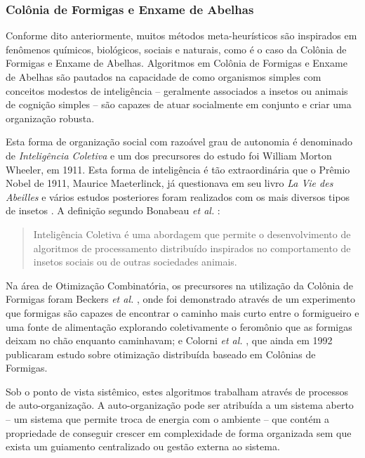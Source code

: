 \subsubsection{Colônia de Formigas e Enxame de Abelhas}
Conforme dito anteriormente, muitos métodos meta-heurísticos são inspirados em fenômenos químicos, biológicos, sociais e naturais, como é o caso da Colônia de Formigas e Enxame de Abelhas. Algoritmos em Colônia de Formigas e Enxame de Abelhas são pautados na capacidade de como organismos simples com conceitos modestos de inteligência -- geralmente associados a insetos ou animais de cognição simples -- são capazes de atuar socialmente em conjunto e criar uma organização robusta.

Esta forma de organização social com razoável grau de autonomia é denominado de \emph{Inteligência Coletiva} e um dos precursores do estudo foi William Morton Wheeler, em 1911. Esta forma de inteligência é tão extraordinária que o Prêmio Nobel de 1911, Maurice Maeterlinck, já questionava em seu livro \emph{La Vie des Abeilles} e vários estudos posteriores foram realizados com os mais diversos tipos de insetos \cite{Dorigo2010}. A definição segundo Bonabeau \emph{et al.} \cite{bonabeau1999swarm}:

\begin{quote}
Inteligência Coletiva é uma abordagem que permite o desenvolvimento de algoritmos de processamento distribuído inspirados no comportamento de insetos sociais ou de outras sociedades animais.
\end{quote}

Na área de Otimização Combinatória, os precursores na utilização da Colônia de Formigas foram Beckers \emph{et al.} \cite{Beckers1992TrailsAU}, onde foi demonstrado através de um experimento que formigas são capazes de encontrar o caminho mais curto entre o formigueiro e uma fonte de alimentação explorando coletivamente o feromônio que as formigas deixam no chão enquanto caminhavam; e Colorni \emph{et al.} \cite{colorni1992distributed}, que ainda em 1992 publicaram estudo sobre otimização distribuída baseado em Colônias de Formigas.

Sob o ponto de vista sistêmico, estes algoritmos trabalham através de processos de auto-organização. A auto-organização pode ser atribuída a um sistema aberto -- um sistema que permite troca de energia com o ambiente -- que contém a propriedade de conseguir crescer em complexidade de forma organizada sem que exista um guiamento centralizado ou gestão externa ao sistema.

